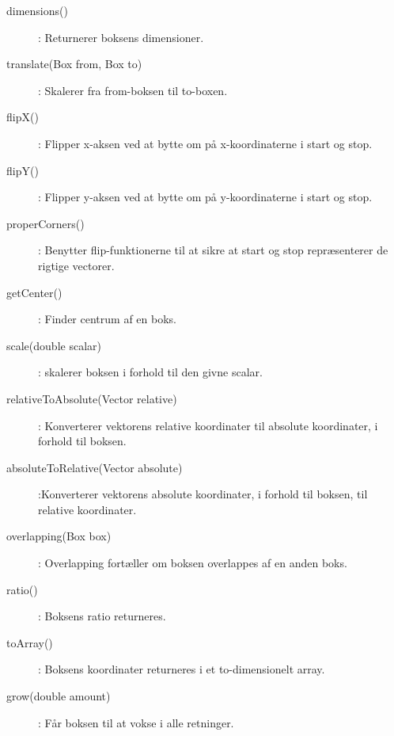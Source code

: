 \begin{description}
	\item [dimensions()]: Returnerer boksens dimensioner.
	\item [translate(Box from, Box to)]: Skalerer fra from-boksen til to-boxen.
	\item [flipX()]: Flipper x-aksen ved at bytte om på x-koordinaterne i start og stop.
	\item [flipY()]: Flipper y-aksen ved at bytte om på y-koordinaterne i start og stop.
	\item [properCorners()]: Benytter flip-funktionerne til at sikre at start og stop repræsenterer de rigtige vectorer.
	\item [getCenter()]: Finder centrum af en boks.
	\item [scale(double scalar)]: skalerer boksen i forhold til den givne scalar.
	\item [relativeToAbsolute(Vector relative)]: Konverterer vektorens relative koordinater til absolute koordinater, i forhold til boksen.
	\item [absoluteToRelative(Vector absolute)]:Konverterer vektorens absolute koordinater, i forhold til boksen, til relative koordinater.
	\item [overlapping(Box box)]: Overlapping fortæller om boksen overlappes af en anden boks.
	\item [ratio()]: Boksens ratio returneres.
	\item [toArray()]: Boksens koordinater returneres i et to-dimensionelt array.
	\item [grow(double amount)]: Får boksen til at vokse i alle retninger.
\end{description}